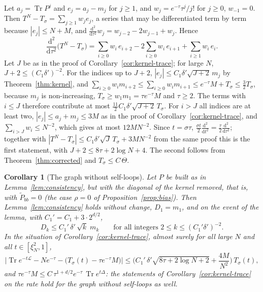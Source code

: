 \documentclass[11pt,a4paper]{article}
\makeatletter
\theoremstyle{stmt}
\newtheorem{corollary}[theorem]{Corollary}
\theoremstyle{defn}
\theoremstyle{rmk}
\renewenvironment{proof}[1][\proofname]{\par\pushQED{\qed}\normalfont\topsep6\p@\@plus6\p@\relax
  \trivlist\item[\hskip\labelsep{\sffamily\itshape\small #1.}]\ignorespaces}{\popQED\endtrivlist\@endpefalse}
\numberwithin{equation}{section}
\DeclareMathOperator{\Tr}{Tr}
\newcommand{\Lc}{\mathcal{L}}
\newcommand{\dd}{\mathrm{d}}
\makeatother
\begin{document}
{\begin{proof}
Let $a_j=\Tr P^j$ and $e_j=a_j-m_j$ for $j\ge1$, and $w_j=e^{-\tau}\tau^j/j!$ for $j\ge0$, $w_{-1}=0$. Then $T^N-T_\sigma=\sum_{j\ge1}w_je_j$, a series that may be differentiated term by term because $|e_j|\le N+M$, and $\frac{\dd^2}{\dd\tau^2}w_j=w_{j-2}-2w_{j-1}+w_j$. Hence
\[
\frac{\dd^2}{\dd\tau^2}\big(T^N-T_\sigma\big)=\sum_{i\ge0}w_i\,e_{i+2}-2\sum_{i\ge0}w_i\,e_{i+1}+\sum_{i\ge1}w_i\,e_i .
\]
Let $J$ be as in the proof of Corollary~\ref{cor:kernel-trace}; for large $N$, $J+2\le(C_1\delta')^{-2}$. For the indices up to $J+2$, $|e_j|\le C_1\delta'\sqrt{J+2}\,m_j$ by Theorem~\ref{thm:kernel}, and $\sum_{i\ge0}w_im_{i+2}\le\sum_{i\ge0}w_im_{i+1}\le e^{-\tau}M+T_\sigma\le\frac32T_\sigma$, because $m_j$ is non-increasing, $T_\sigma\ge w_1m_1=\tau e^{-\tau}M$ and $\tau\ge2$. The terms with $i\le J$ therefore contribute at most $\frac{11}2C_1\delta'\sqrt{J+2}\,T_\sigma$. For $i>J$ all indices are at least two, $|e_j|\le a_j+m_j\le3M$ as in the proof of Corollary~\ref{cor:kernel-trace}, and $\sum_{i>J}w_i\le N^{-2}$, which gives at most $12MN^{-2}$. Since $t=\sigma\tau$, $\frac{\sigma t}2\frac{\dd^2}{\dd t^2}=\frac\tau2\frac{\dd^2}{\dd\tau^2}$; together with $|T^N-T_\sigma|\le C_1\delta'\sqrt J\,T_\sigma+3MN^{-2}$ from the same proof this is the first statement, with $J+2\le8\tau+2\log N+4$. The second follows from Theorem~\ref{thm:corrected} and $T_\sigma\le C\,\Theta$.
\end{proof}

\begin{corollary}[The graph without self-loops]\label{cor:kernel-noloops}
Let $P$ be built as in Lemma~\ref{lem:consistency}, but with the diagonal of the kernel removed, that is, with $\tilde P_{bb}=0$ (the case $\rho=0$ of Proposition~\ref{prop:bias}). Then Lemma~\ref{lem:consistency} holds without change, $D_1=m_1$, and on the event of the lemma, with $C_1'=C_1+3\cdot2^{d/2}$,
\[
D_k\le C_1'\,\delta'\,\sqrt k\;m_k\qquad\text{for all integers }2\le k\le(C_1'\delta')^{-2}.
\]
In the situation of Corollary~\ref{cor:kernel-trace}, almost surely for all large $N$ and all $t\in[\xi_N^2,1]$,
\[
\Big|\Tr e^{-t\Lc}-Ne^{-\tau}-\big(T_\sigma(t)-\tau e^{-\tau}M\big)\Big|\le\Big(C_1'\,\delta'\sqrt{8\tau+2\log N+2}+\frac{4M}{N^2}\Big)\,T_\sigma(t),
\]
and $\tau e^{-\tau}M\le C\,\tau^{1+d/2}e^{-\tau}\,\Tr e^{t\Delta}$: the statements of Corollary~\ref{cor:kernel-trace} on the rate hold for the graph without self-loops as well.
\end{corollary}

}
\end{document}
